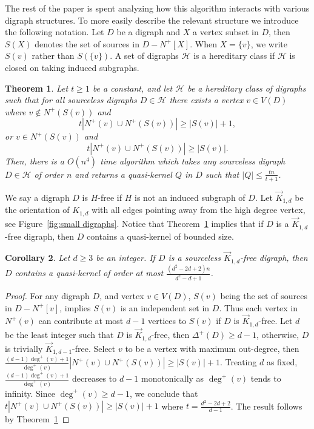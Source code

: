 \documentclass[12pt]{article}
\newtheorem{theorem}{Theorem}[section]
\newtheorem{corollary}[theorem]{Corollary}
\theoremstyle{definition}
\begin{document}
The rest of the paper is spent 
analyzing how this algorithm interacts with various digraph structures.
To more easily describe the relevant structure we introduce the following notation.
Let $D$ be a digraph and $X$ a vertex subset in $D$,
then $S(X)$ denotes the set of sources in $D - N^{+}[X]$.
When $X = \{v\}$, we write $S(v)$ rather than $S(\{v\})$.
A set of digraphs $\mathcal{H}$ is a hereditary class if $\mathcal{H}$ is closed on taking induced subgraphs.


\begin{theorem}\label{Thm: Main CounterStructure}
    Let $t\geq 1$ be a constant, and let 
    $\mathcal{H}$ be a hereditary class of digraphs such that for all sourceless digraphs $D \in \mathcal{H}$
    there exists a vertex $v \in V(D)$ where $v \notin N^+(S(v))$ and
    \[
    t|N^+(v) \cup N^+(S(v))| \geq |S(v)|+1,
    \]
    or  $v \in N^+(S(v))$ and
    \[
    t|N^+(v) \cup N^+(S(v))| \geq |S(v)|.
    \]
    Then, there is a $O(n^4)$ time algorithm
    which takes any sourceless digraph $D \in \mathcal{H}$ of order $n$
    and returns a quasi-kernel $Q$ in $D$ such that
    $|Q| \leq \frac{tn}{t+1}$.
\end{theorem}


We say a digraph $D$ is $H$-free if $H$ is not an induced subgraph of $D$.
Let $\Vec{K}_{1,d}$ be the orientation of $K_{1,d}$ with all edges pointing away from the high degree vertex,
see Figure~\ref{fig:small digraphs}.
Notice that Theorem~\ref{Thm: Main CounterStructure}
implies that
if $D$ is a $\Vec{K}_{1,d}$-free digraph,
then $D$ contains a quasi-kernel of bounded size.



\begin{corollary}\label{Coro: Induced Stars}
    Let $d\geq 3$ be an integer.
    If $D$ is a sourceless $\Vec{K}_{1,d}$-free digraph,
    then $D$ contains a quasi-kernel of order at most $\frac{(d^2 - 2d + 2)n}{d^2-d+1}$.
\end{corollary}

\begin{proof}
    For any digraph $D$, and vertex $v \in V(D)$, 
    $S(v)$ being the set of sources in $D - N^+[v]$, implies $S(v)$ is an independent set in $D$.
    Thus each vertex in $N^{+}(v)$ can contribute at most $d-1$ 
    vertices to $S(v)$ if $D$ is $\Vec{K}_{1,d}$-free.
    Let $d$ be the least integer such that $D$ is $\Vec{K}_{1,d}$-free,
    then $\Delta^+(D)\geq d-1$, otherwise, $D$ is trivially $\Vec{K}_{1,d-1}$-free.
    Select $v$ to be a vertex with maximum out-degree, then 
    $\frac{(d-1)\deg^+(v) + 1}{\deg^+(v)}|N^+(v) \cup N^+(S(v))| \geq  |S(v)|+1$.
    Treating $d$ as fixed, $\frac{(d-1)\deg^+(v) + 1}{\deg^+(v)}$ decreases to $d-1$ monotonically as $\deg^+(v)$ tends to infinity.
    Since $\deg^+(v)\geq d-1$,
    we conclude that 
    $t|N^+(v) \cup N^+(S(v))| \geq  |S(v)|+1$
    where $t = \frac{d^2-2d+2}{d-1}$.
    The result follows by Theorem~\ref{Thm: Main CounterStructure}
\end{proof}
\end{document}
